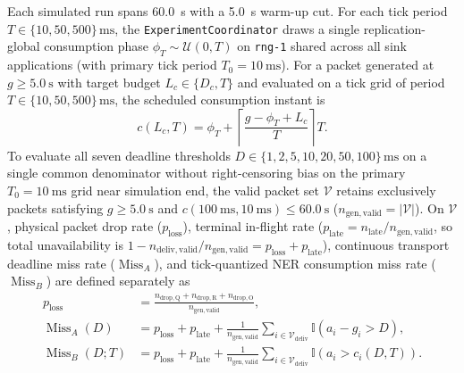 \documentclass[11pt,a4paper]{article}
\newcommand{\MissA}{\ensuremath{\operatorname{Miss}_A}}
\newcommand{\MissB}{\ensuremath{\operatorname{Miss}_B}}
\newcommand{\ploss}{\ensuremath{p_{\mathrm{loss}}}}
\begin{document}
Each simulated run spans \qty{60.0}{\second} with a \qty{5.0}{\second} warm-up cut. For each tick period $T \in \{10, 50, 500\}\,\text{ms}$, the \texttt{ExperimentCoordinator} draws a single replication-global consumption phase $\phi_T \sim \mathcal{U}(0, T)$ on \texttt{rng-1} shared across all sink applications (with primary tick period $T_0 = \qty{10}{\milli\second}$). For a packet generated at $g \ge \qty{5.0}{\second}$ with target budget $L_c \in \{D_c, T\}$ and evaluated on a tick grid of period $T \in \{10, 50, 500\}\,\text{ms}$, the scheduled consumption instant is
\begin{equation}
c(L_c, T) = \phi_T + \left\lceil \frac{g - \phi_T + L_c}{T} \right\rceil T.
\label{eq:consumption_tick}
\end{equation}
To evaluate all seven deadline thresholds $D \in \{1, 2, 5, 10, 20, 50, 100\}\,\text{ms}$ on a single common denominator without right-censoring bias on the primary $T_0 = \qty{10}{\milli\second}$ grid near simulation end, the valid packet set $\mathcal{V}$ retains exclusively packets satisfying $g \ge \qty{5.0}{\second}$ and $c(\qty{100}{\milli\second}, \qty{10}{\milli\second}) \le \qty{60.0}{\second}$ ($n_{\mathrm{gen,valid}} = |\mathcal{V}|$). On $\mathcal{V}$, physical packet drop rate ($\ploss$), terminal in-flight rate ($p_{\mathrm{late}} = n_{\mathrm{late}} / n_{\mathrm{gen,valid}}$, so total unavailability is $1 - n_{\mathrm{deliv,valid}}/n_{\mathrm{gen,valid}} = \ploss + p_{\mathrm{late}}$), continuous transport deadline miss rate ($\MissA$), and tick-quantized NER consumption miss rate ($\MissB$) are defined separately as
\begin{align}
\ploss &= \frac{n_{\mathrm{drop,Q}} + n_{\mathrm{drop,R}} + n_{\mathrm{drop,O}}}{n_{\mathrm{gen,valid}}}, \label{eq:ploss} \\
\MissA(D) &= \ploss + p_{\mathrm{late}} + \frac{1}{n_{\mathrm{gen,valid}}} \sum_{i \in \mathcal{V}_{\mathrm{deliv}}} \mathbb{I}\!\left(a_i - g_i > D\right), \label{eq:miss_a} \\
\MissB(D; T) &= \ploss + p_{\mathrm{late}} + \frac{1}{n_{\mathrm{gen,valid}}} \sum_{i \in \mathcal{V}_{\mathrm{deliv}}} \mathbb{I}\!\left(a_i > c_i(D, T)\right). \label{eq:miss_b}
\end{align}
\end{document}
